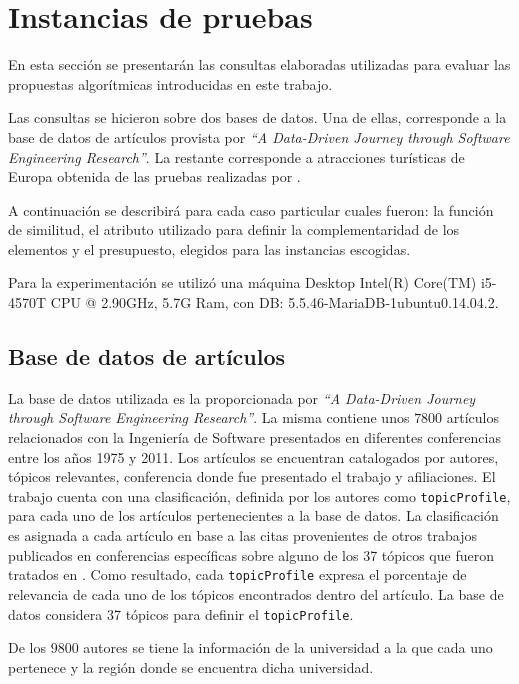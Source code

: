 \section{Instancias de pruebas}\label{sect:busquedas}
En esta sección se presentarán las consultas elaboradas utilizadas para evaluar las propuestas algorítmicas introducidas en este trabajo. 

Las consultas se hicieron sobre dos bases de datos. Una de ellas, corresponde a la base de datos de artículos provista por \textit{\textquotedblleft A Data-Driven Journey through Software Engineering Research\textquotedblright}\cite{dataDrive}. La restante corresponde a atracciones turísticas de Europa obtenida de las pruebas realizadas por \cite{journals/tkde/Amer-YahiaBCFMZ14}.

A continuación se describirá para cada caso particular cuales fueron: la función de similitud, el atributo utilizado para definir la complementaridad de los elementos y el presupuesto, elegidos para las instancias escogidas. 

Para la experimentación se utilizó una máquina Desktop Intel(R) Core(TM) i5-4570T CPU @ 2.90GHz, 5.7G Ram, con DB: 5.5.46-MariaDB-1ubuntu0.14.04.2.

\subsection{Base de datos de artículos}
La base de datos utilizada es la proporcionada por \textit{\textquotedblleft A Data-Driven Journey through Software Engineering Research\textquotedblright}\cite{dataDrive}. La misma contiene unos $7800$ artículos relacionados con la Ingeniería de Software presentados en diferentes conferencias entre los años 1975 y 2011. Los artículos se encuentran catalogados por autores, tópicos relevantes, conferencia donde fue presentado el trabajo y afiliaciones. El trabajo cuenta con una clasificación, definida por los autores como \texttt{topicProfile}, para cada uno de los artículos pertenecientes a la base de datos. La clasificación es asignada a cada artículo en base a las citas provenientes de otros trabajos publicados en conferencias específicas sobre alguno de los 37 tópicos que fueron tratados en \cite{dataDrive}. Como resultado, cada \texttt{topicProfile} expresa el porcentaje de relevancia de cada uno de los tópicos encontrados dentro del artículo. La base de datos considera 37 tópicos para definir el \texttt{topicProfile}.

De los $9800$ autores se tiene la información de la universidad a la que cada uno pertenece y la región donde se encuentra dicha universidad.

